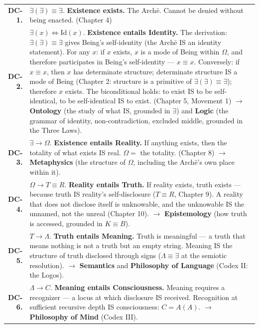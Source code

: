 \documentclass[10pt, openany, oneside]{book}
\renewcommand{\footnotesize}{\fontsize{8.5}{11}\selectfont}
\begin{document}
{\footnotesize
\noindent\begin{tabular}{r p{}}
\textbf{DC-1.} & $\exists(\exists) \equiv \exists$. \textbf{Existence exists.} The Arch\={e}. Cannot be denied without being enacted. (Chapter 4) \\[0.3em]
\textbf{DC-2.} & $\exists(x) \iff \text{Id}(x)$. \textbf{Existence entails Identity.} The derivation: $\exists(\exists) \equiv \exists$ gives Being's self-identity (the Arch\={e} IS an identity statement). For any $x$: if $x$ exists, $x$ is a mode of Being within $\Omega$, and therefore participates in Being's self-identity --- $x \equiv x$. Conversely: if $x \equiv x$, then $x$ has determinate structure; determinate structure IS a mode of Being (Chapter 2: structure is a primitive of $\exists(\exists) \equiv \exists$); therefore $x$ exists. The biconditional holds: to exist IS to be self-identical, to be self-identical IS to exist. (Chapter 5, Movement 1) $\to$ \textbf{Ontology} (the study of what IS, grounded in $\exists$) and \textbf{Logic} (the grammar of identity, non-contradiction, excluded middle, grounded in the Three Laws). \\[0.3em]
\textbf{DC-3.} & $\exists \to \Omega$. \textbf{Existence entails Reality.} If anything exists, then the totality of what exists IS real. $\Omega = $ the totality. (Chapter 8) $\to$ \textbf{Metaphysics} (the structure of $\Omega$, including the Arch\={e}'s own place within it). \\[0.3em]
\textbf{DC-4.} & $\Omega \to T \equiv R$. \textbf{Reality entails Truth.} If reality exists, truth exists --- because truth IS reality's self-disclosure ($T \equiv R$, Chapter 9). A reality that does not disclose itself is unknowable, and the unknowable IS the unnamed, not the unreal (Chapter 10). $\to$ \textbf{Epistemology} (how truth is accessed, grounded in $K \equiv B$). \\[0.3em]
\textbf{DC-5.} & $T \to \Lambda$. \textbf{Truth entails Meaning.} Truth is meaningful --- a truth that means nothing is not a truth but an empty string. Meaning IS the structure of truth disclosed through signs ($\Lambda \equiv \exists$ at the semiotic resolution). $\to$ \textbf{Semantics} and \textbf{Philosophy of Language} (Codex II: the Logos). \\[0.3em]
\textbf{DC-6.} & $\Lambda \to C$. \textbf{Meaning entails Consciousness.} Meaning requires a recognizer --- a locus at which disclosure IS received. Recognition at sufficient recursive depth IS consciousness: $C = A(A)$. $\to$ \textbf{Philosophy of Mind} (Codex III). \\[0.3em]

\end{tabular}}
\end{document}
